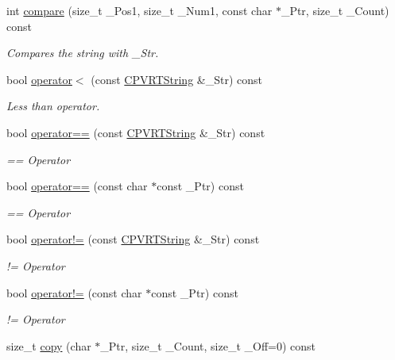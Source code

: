 \begin{DoxyCompactItemize}
int \hyperlink{class_c_p_v_r_t_string_a120a792d44eb8846d7c7e1b76aed6344}{compare} (size\+\_\+t \+\_\+\+Pos1, size\+\_\+t \+\_\+\+Num1, const char $\ast$\+\_\+\+Ptr, size\+\_\+t \+\_\+\+Count) const 
\begin{DoxyCompactList}\small\item\em Compares the string with \+\_\+\+Str. \end{DoxyCompactList}\item 
bool \hyperlink{class_c_p_v_r_t_string_ac887244c7a66c51e9921535ffb27349a}{operator$<$} (const \hyperlink{class_c_p_v_r_t_string}{C\+P\+V\+R\+T\+String} \&\+\_\+\+Str) const 
\begin{DoxyCompactList}\small\item\em Less than operator. \end{DoxyCompactList}\item 
bool \hyperlink{class_c_p_v_r_t_string_a836dd5933c9a83b11bc0be8e7313410a}{operator==} (const \hyperlink{class_c_p_v_r_t_string}{C\+P\+V\+R\+T\+String} \&\+\_\+\+Str) const 
\begin{DoxyCompactList}\small\item\em == Operator \end{DoxyCompactList}\item 
bool \hyperlink{class_c_p_v_r_t_string_a83a09c08aa0e4286a000ca7d460d7220}{operator==} (const char $\ast$const \+\_\+\+Ptr) const 
\begin{DoxyCompactList}\small\item\em == Operator \end{DoxyCompactList}\item 
bool \hyperlink{class_c_p_v_r_t_string_acd1bdcc44016b292b30dcf85740b8076}{operator!=} (const \hyperlink{class_c_p_v_r_t_string}{C\+P\+V\+R\+T\+String} \&\+\_\+\+Str) const 
\begin{DoxyCompactList}\small\item\em != Operator \end{DoxyCompactList}\item 
bool \hyperlink{class_c_p_v_r_t_string_ad282af0e6f045a5cc9332a87d0a72ef5}{operator!=} (const char $\ast$const \+\_\+\+Ptr) const 
\begin{DoxyCompactList}\small\item\em != Operator \end{DoxyCompactList}\item 
size\+\_\+t \hyperlink{class_c_p_v_r_t_string_a3360bd32ab0576fd575705c1a4be7966}{copy} (char $\ast$\+\_\+\+Ptr, size\+\_\+t \+\_\+\+Count, size\+\_\+t \+\_\+\+Off=0) const 

\end{DoxyCompactItemize}
